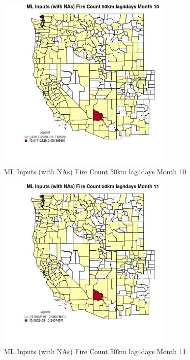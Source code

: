 \begin{figure} 
\centering  
\includegraphics[width=0.77\textwidth]{Code_Outputs/Report_ML_input_PM25_Step4_part_e_de_duplicated_aves_compiled_2019-05-20wNAs_CountyFire_Count_50km_lag4daysmedianMonth10.jpg} 
\caption{\label{fig:Report_ML_input_PM25_Step4_part_e_de_duplicated_aves_compiled_2019-05-20wNAsCountyFire_Count_50km_lag4daysmedianMonth10}ML Inputs (with NAs) Fire Count 50km lag4days Month 10} 
\end{figure} 
 

\begin{figure} 
\centering  
\includegraphics[width=0.77\textwidth]{Code_Outputs/Report_ML_input_PM25_Step4_part_e_de_duplicated_aves_compiled_2019-05-20wNAs_CountyFire_Count_50km_lag4daysmedianMonth11.jpg} 
\caption{\label{fig:Report_ML_input_PM25_Step4_part_e_de_duplicated_aves_compiled_2019-05-20wNAsCountyFire_Count_50km_lag4daysmedianMonth11}ML Inputs (with NAs) Fire Count 50km lag4days Month 11} 
\end{figure} 
 

